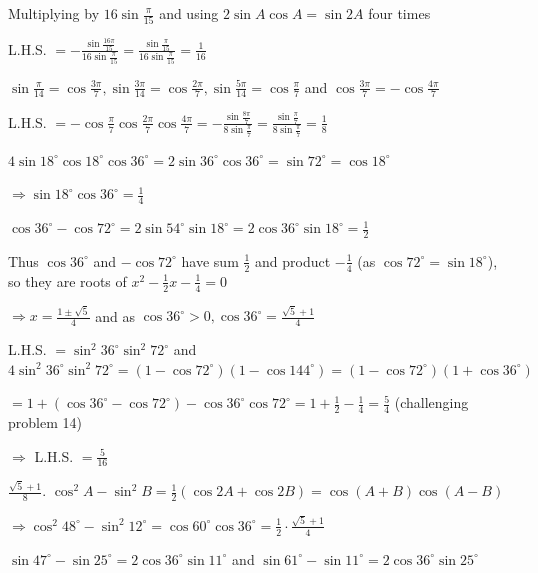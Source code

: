   Multiplying by $16\sin\frac{\pi}{15}$ and using $2\sin A\cos A = \sin 2A$ four times

  L.H.S. $= -\frac{\sin\frac{16\pi}{15}}{16\sin\frac{\pi}{15}} = \frac{\sin\frac{\pi}{15}}{16\sin\frac{\pi}{15}} =
  \frac{1}{16}$

\item $\sin\frac{\pi}{14} = \cos\frac{3\pi}{7}, \sin\frac{3\pi}{14} = \cos\frac{2\pi}{7}, \sin\frac{5\pi}{14} =
  \cos\frac{\pi}{7}$ and $\cos\frac{3\pi}{7} = -\cos\frac{4\pi}{7}$

  L.H.S. $= -\cos\frac{\pi}{7}\cos\frac{2\pi}{7}\cos\frac{4\pi}{7} = -\frac{\sin\frac{8\pi}{7}}{8\sin\frac{\pi}{7}} =
  \frac{\sin\frac{\pi}{7}}{8\sin\frac{\pi}{7}} = \frac{1}{8}$

\item $4\sin 18^\circ\cos 18^\circ\cos 36^\circ = 2\sin 36^\circ\cos 36^\circ = \sin 72^\circ = \cos 18^\circ$

  $\Rightarrow \sin 18^\circ\cos 36^\circ = \frac{1}{4}$

  $\cos 36^\circ - \cos 72^\circ = 2\sin 54^\circ\sin 18^\circ = 2\cos 36^\circ\sin 18^\circ = \frac{1}{2}$

  Thus $\cos 36^\circ$ and $-\cos 72^\circ$ have sum $\frac{1}{2}$ and product $-\frac{1}{4}$ (as $\cos 72^\circ = \sin
  18^\circ$), so they are roots of $x^2 - \frac{1}{2}x - \frac{1}{4} = 0$

  $\Rightarrow x = \frac{1 \pm \sqrt{5}}{4}$ and as $\cos 36^\circ > 0, \cos 36^\circ = \frac{\sqrt{5} + 1}{4}$

\item L.H.S. $= \sin^2 36^\circ\sin^2 72^\circ$ and $4\sin^2 36^\circ\sin^2 72^\circ = (1 - \cos 72^\circ)(1 - \cos 144^\circ)
  = (1 - \cos 72^\circ)(1 + \cos 36^\circ)$

  $= 1 + (\cos 36^\circ - \cos 72^\circ) - \cos 36^\circ\cos 72^\circ = 1 + \frac{1}{2} - \frac{1}{4} = \frac{5}{4}$ (challenging problem 14)

  $\Rightarrow$ L.H.S. $= \frac{5}{16}$

\item $\frac{\sqrt{5} + 1}{8}$. $\cos^2 A - \sin^2 B = \frac{1}{2}(\cos 2A + \cos 2B) = \cos(A + B)\cos(A - B)$

  $\Rightarrow \cos^2 48^\circ - \sin^2 12^\circ = \cos 60^\circ\cos 36^\circ = \frac{1}{2}\cdot\frac{\sqrt{5} + 1}{4}$

\item $\sin 47^\circ - \sin 25^\circ = 2\cos 36^\circ\sin 11^\circ$ and $\sin 61^\circ - \sin 11^\circ = 2\cos 36^\circ\sin
  25^\circ$


